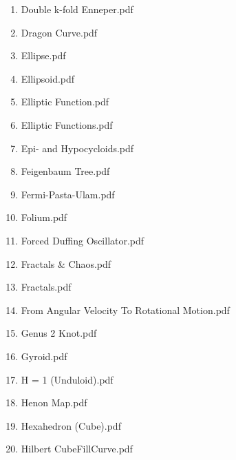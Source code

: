 \documentclass[11pt]{article}
\begin{document}
\begin{enumerate}
\begin{enumerate}
\item Double k-fold Enneper.pdf
\label{sec-1-1-1-1-29-20-35}

\item Dragon Curve.pdf
\label{sec-1-1-1-1-29-20-36}

\item Ellipse.pdf
\label{sec-1-1-1-1-29-20-37}

\item Ellipsoid.pdf
\label{sec-1-1-1-1-29-20-38}

\item Elliptic Function.pdf
\label{sec-1-1-1-1-29-20-39}

\item Elliptic Functions.pdf
\label{sec-1-1-1-1-29-20-40}

\item Epi- and Hypocycloids.pdf
\label{sec-1-1-1-1-29-20-41}

\item Feigenbaum Tree.pdf
\label{sec-1-1-1-1-29-20-42}

\item Fermi-Pasta-Ulam.pdf
\label{sec-1-1-1-1-29-20-43}

\item Folium.pdf
\label{sec-1-1-1-1-29-20-44}

\item Forced Duffing Oscillator.pdf
\label{sec-1-1-1-1-29-20-45}

\item Fractals \& Chaos.pdf
\label{sec-1-1-1-1-29-20-46}

\item Fractals.pdf
\label{sec-1-1-1-1-29-20-47}

\item From Angular Velocity To Rotational Motion.pdf
\label{sec-1-1-1-1-29-20-48}

\item Genus 2 Knot.pdf
\label{sec-1-1-1-1-29-20-49}

\item Gyroid.pdf
\label{sec-1-1-1-1-29-20-50}

\item H = 1  (Unduloid).pdf
\label{sec-1-1-1-1-29-20-51}

\item Henon Map.pdf
\label{sec-1-1-1-1-29-20-52}

\item Hexahedron (Cube).pdf
\label{sec-1-1-1-1-29-20-53}

\item Hilbert CubeFillCurve.pdf
\label{sec-1-1-1-1-29-20-54}


\end{enumerate}
\end{enumerate}
\end{document}
